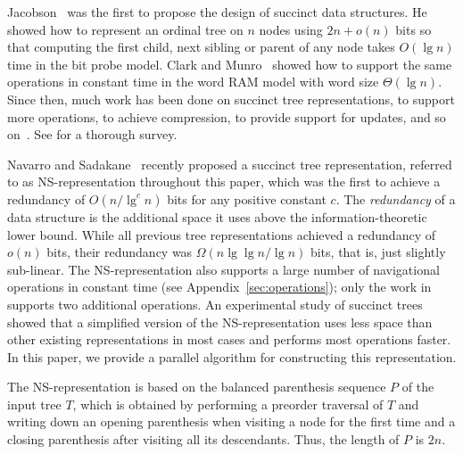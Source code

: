 Jacobson~\cite{j1989} was the first to  propose the design of succinct data
structures.  He showed how to represent an ordinal tree on $n$ nodes
using $2n+o(n)$ bits so that computing the first child, next sibling
or parent of any node takes $O(\lg n)$ time in the bit probe
model.  Clark and Munro~\cite{cm1996} showed how to support the same
operations in constant time in the word RAM model with word size
$\Theta(\lg n)$.  Since then, much work has been done on succinct tree
representations, to support more operations, to achieve compression,
to provide support for updates, and so
on~\cite{mr1997,bdmr1999,grr2004,jss2007,ly2008,hms2012,fm2014,Navarro:2014:FFS:2620785.2601073}.
See \cite{rr2013} for a thorough survey.

Navarro and Sadakane~\cite{Navarro:2014:FFS:2620785.2601073} recently
proposed a succinct tree representation, referred to as
NS-representation throughout this paper, which was the first to
achieve a redundancy of $O(n/\lg^c n)$ bits for any positive constant
$c$.  The \emph{redundancy} of a data structure is the additional
space it uses above the information-theoretic lower bound.  While all
previous tree representations achieved a redundancy of $o(n)$ bits,
their redundancy was $\Omega(n \lg\lg n / \lg n)$ bits, that is, just
slightly sub-linear.  The NS-representation also supports a large
number of navigational operations in constant time (see
Appendix~\ref{sec:operations});
only the work in \cite{hms2012,fm2014} supports two additional operations.
An experimental study of succinct trees~\cite{ACNSalenex10} showed that a
simplified version of the NS-representation uses less space than other
existing representations in most cases and performs most operations
faster.  In this paper, we provide a parallel algorithm for
constructing this representation.

The NS-representation is based on the balanced parenthesis sequence
$P$ of the input tree $T$, which is obtained by performing a preorder
traversal of $T$ and writing down an opening parenthesis when visiting a node
for the first time and a closing parenthesis after visiting all
its descendants.  Thus, the length of $P$ is $2n$.

